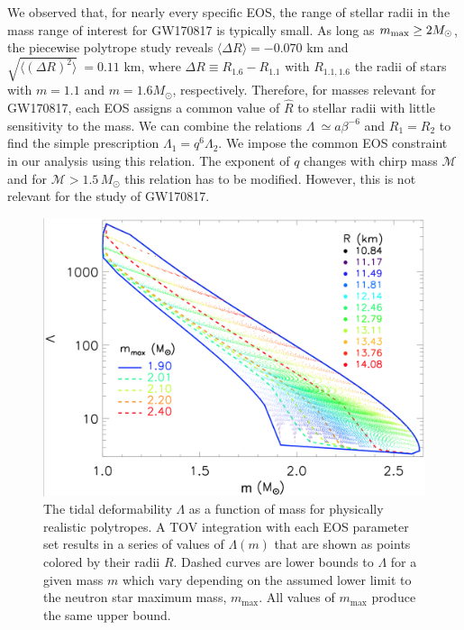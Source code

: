 We observed that, for nearly every specific EOS, the range of stellar radii in the mass range of interest for GW170817 is typically small. As long as $m_{\rm max}\ge 2M_\odot$, the piecewise polytrope study reveals $\langle \Delta R \rangle =-0.070$ km and $\sqrt{\langle(\Delta R)^2\rangle}~=0.11$ km, where $\Delta R \equiv R_{1.6}-R_{1.1}$ with $R_{1.1,1.6}$ the radii of stars with $m=1.1$ and $m=1.6M_\odot$, respectively. Therefore, for masses relevant for GW170817, each EOS assigns a common value of $\hat R$ to stellar radii with little sensitivity to the mass. We can combine the relations $\Lambda~\simeq a\beta^{-6}$ and $R_1=R_2$ to find the simple prescription $\Lambda_1=q^6\Lambda_2$. We impose the common EOS constraint in our analysis using this relation. The exponent of $q$ changes with chirp mass $\mathcal{M}$ and for $\mathcal{M} > 1.5\,M_\odot$ this relation has to be modified. However, this is not relevant for the study of GW170817.

\begin{figure}[t]
  \includegraphics[width=\textwidth]{Figures/common-radius/lam-mass.png}
  \caption{The tidal deformability $\Lambda$ as a function of mass for physically realistic polytropes. A TOV integration with each EOS parameter set results in a series of values of $\Lambda(m)$ that are shown as points colored by their radii $R$. Dashed curves are lower bounds to $\Lambda$ for a given mass $m$ which vary depending on the assumed lower limit to the neutron star maximum mass, $m_\mathrm{max}$.  All values of $m_\mathrm{max}$ produce the same upper bound. \label{fig:lam-mass}}
\end{figure}



